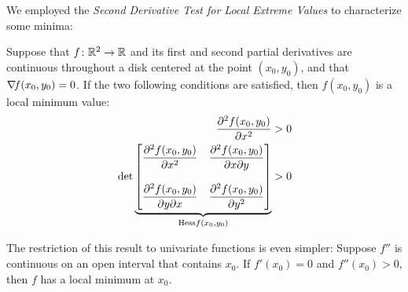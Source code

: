 We employed the \emph{Second Derivative Test for Local Extreme Values} to characterize some minima:
\begin{theorem}\label{theorem:2DTforLEV}
Suppose that $f\colon \mathbb{R}^2 \to \mathbb{R}$ and its first and second partial derivatives are continuous throughout a disk centered at the point $(x_0,y_0)$, and that $\mathop{\nabla\! {f}}(x_0,y_0)=0$. If the two following conditions are satisfied, then $f(x_0,y_0)$ is a local minimum value:
\begin{align}
\frac{\partial^2 f (x_0,y_0)}{\partial x^2} &> 0 \\
\det \underbrace{\begin{bmatrix} 
\dfrac{\partial^2 f (x_0,y_0)}{\partial x^2} & \dfrac{\partial^2 f (x_0,y_0)}{\partial x \partial y} \\ & \\
\dfrac{\partial^2 f (x_0,y_0) }{\partial y \partial x} & \dfrac{\partial^2 f (x_0,y_0)}{\partial y^2}
\end{bmatrix}}_{\mathop{\mathrm{Hess}{f}}(x_0,y_0)} &> 0
\end{align}
\end{theorem}

\begin{remark}
The restriction of this result to univariate functions is even simpler: Suppose $f''$ is continuous on an open interval that contains $x_0$.  If $f'(x_0)=0$ and $f''(x_0)>0$, then $f$ has a local minimum at $x_0$. 
\end{remark}

